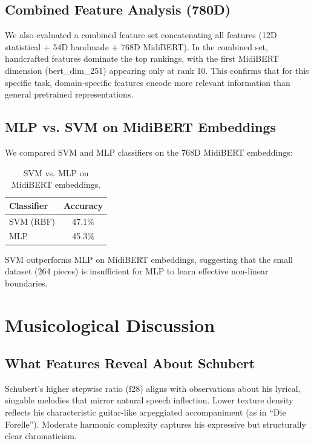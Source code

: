 \documentclass{article}
\begin{document}
\subsection{Combined Feature Analysis (780D)}

We also evaluated a combined feature set concatenating all features (12D statistical + 54D handmade + 768D MidiBERT). In the combined set, handcrafted features dominate the top rankings, with the first MidiBERT dimension (bert\_dim\_251) appearing only at rank 10. This confirms that for this specific task, domain-specific features encode more relevant information than general pretrained representations.

\subsection{MLP vs. SVM on MidiBERT Embeddings}

We compared SVM and MLP classifiers on the 768D MidiBERT embeddings:

\begin{table}[h]
\centering
\caption{SVM vs. MLP on MidiBERT embeddings.}
\label{tab:mlp}
\begin{tabular}{lc}
\toprule
Classifier & Accuracy \\
\midrule
SVM (RBF) & 47.1\% \\
MLP & 45.3\% \\
\bottomrule
\end{tabular}
\end{table}

SVM outperforms MLP on MidiBERT embeddings, suggesting that the small dataset (264 pieces) is insufficient for MLP to learn effective non-linear boundaries.

\section{Musicological Discussion}\label{sec:discussion}

\subsection{What Features Reveal About Schubert}

Schubert's higher stepwise ratio (f28) aligns with observations about his lyrical, singable melodies that mirror natural speech inflection. Lower texture density reflects his characteristic guitar-like arpeggiated accompaniment (as in ``Die Forelle''). Moderate harmonic complexity captures his expressive but structurally clear chromaticism.
\end{document}
